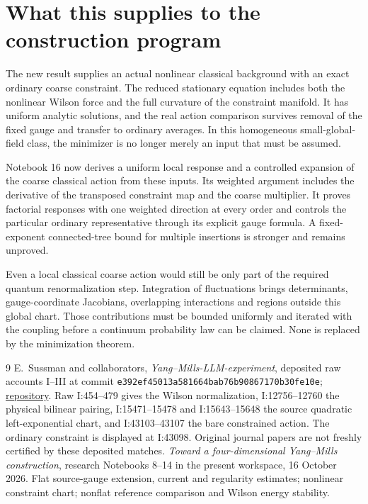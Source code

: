 
\section{What this supplies to the construction program}
\label{nm15-ledger}

The new result supplies an actual nonlinear classical background
with an exact ordinary coarse constraint. The reduced stationary
equation includes both the nonlinear Wilson force and the full
curvature of the constraint manifold. It has uniform analytic
solutions, and the real action comparison survives removal of
the fixed gauge and transfer to ordinary averages. In this
homogeneous small-global-field class, the minimizer is no longer
merely an input that must be assumed.

Notebook 16 now derives a uniform local response and a controlled
expansion of the coarse classical action from these inputs.
Its weighted argument includes the derivative of the transposed
constraint map and the coarse multiplier. It proves factorial
responses with one weighted direction at every order and controls
the particular ordinary representative through its explicit gauge
formula. A fixed-exponent connected-tree bound for multiple
insertions is stronger and remains unproved.

Even a local classical coarse action would still be only part
of the required quantum renormalization step. Integration of
fluctuations brings determinants, gauge-coordinate Jacobians,
overlapping interactions and regions outside this global chart.
Those contributions must be bounded uniformly and iterated
with the coupling before a continuum probability law can be
claimed. None is replaced by the minimization theorem.

\begin{thebibliography}{9}
E.~Sussman and collaborators, \emph{Yang--Mills-LLM-experiment},
deposited raw accounts I--III at commit
\texttt{e392ef45013a581664bab76b90867170b30fe10e};
\href{https://github.com/ethanwsussman/Yang--Mills-LLM-experiment}{repository}.
Raw I:454--479 gives the Wilson normalization,
I:12756--12760 the physical bilinear pairing,
I:15471--15478 and I:15643--15648 the source quadratic
left-exponential chart, and I:43103--43107 the bare
constrained action. The ordinary constraint is displayed
at I:43098. Original journal papers are not freshly
certified by these deposited matches.
\emph{Toward a four-dimensional Yang--Mills construction},
research Notebooks 8--14 in the present workspace,
16 October 2026. Flat source-gauge extension, current and
regularity estimates; nonlinear constraint chart; nonflat
reference comparison and Wilson energy stability.
\end{thebibliography}

